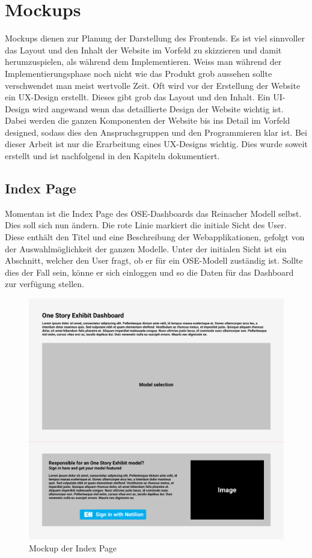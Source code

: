 \section{Mockups}
Mockups dienen zur Planung der Darstellung des Frontends. Es ist viel sinnvoller das Layout und den Inhalt der Website im Vorfeld zu skizzieren und damit herumzuspielen, als während dem Implementieren. Weiss man während der Implementierungsphase noch nicht wie das Produkt grob aussehen sollte verschwendet man meist wertvolle Zeit.
\newline
Oft wird vor der Erstellung der Website ein UX-Design erstellt. Dieses gibt grob das Layout und den Inhalt. Ein UI-Design wird angewand wenn das detaillierte Design der Website wichtig ist. Dabei werden die ganzen Komponenten der Website bis ins Detail im Vorfeld designed, sodass dies den Anspruchsgruppen und den Programmieren klar ist.
\newline
Bei dieser Arbeit ist nur die Erarbeitung eines UX-Designs wichtig. Dies wurde soweit erstellt und ist nachfolgend in den Kapiteln dokumentiert.
\pagebreak
\subsection{Index Page} \label{mck:index} 
Momentan ist die Index Page des OSE-Dashboards das Reinacher Modell selbst. Dies soll sich nun ändern. Die rote Linie markiert die initiale Sicht des User. Diese enthält den Titel und eine Beschreibung der Webapplikationen, gefolgt von der Auswahlmöglichkeit der ganzen Modelle. Unter der initialen Sicht ist ein Abschnitt, welcher den User fragt, ob er für ein OSE-Modell zuständig ist. Sollte dies der Fall sein, könne er sich einloggen und so die Daten für das Dashboard zur verfügung stellen.
\begin{figure}[H]
  \centering
  \includegraphics[width=1\textwidth]{./mockups/index/not_signed_in.pdf}
  \caption[{Mockup der Index Page}]{Mockup der Index Page}
  \label{fig:mck-index}
\end{figure}
\pagebreak
